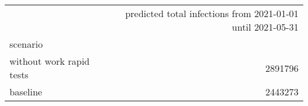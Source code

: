 \begin{tabular}{lr}
\toprule
{} &  predicted total infections from 2021-01-01 until 2021-05-31 \\
scenario                  &                                                              \\
\midrule
 without work rapid tests &                                            2891796 \\
 baseline                 &                                            2443273 \\
\bottomrule
\end{tabular}
